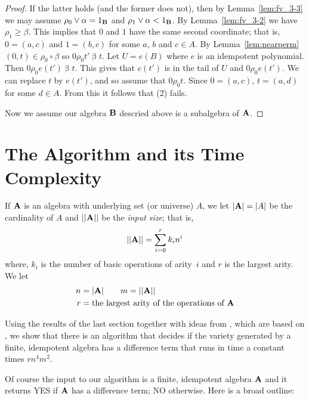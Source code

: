\begin{proof}
If the latter holds (and the former does not), then
by Lemma~\ref{lem:fv_3-3} we may 
assume $\rho_0 \join \alpha = 1_{\alg B}$ and
$\rho_1 \join \alpha < 1_{\alg B}$. By Lemma~\ref{lem:fv_3-2}
we have $\rho_1 \ge \beta$.
This implies that $0$ and $1$ have the same second coordinate; that is,
$0 = (a,c)$ and $1 = (b,c)$ for some $a$, $b$ and $c\in A$.
By Lemma~\ref{lem:nearperm} $(0,t) \in \rho_0 \circ \beta$
so $0 \mathrel {\rho_0} t' \mathrel{\beta} t$. Let $U = e(B)$
where $e$ is an idempotent polynomial. Then
$0 \mathrel {\rho_0} e(t') \mathrel{\beta} t$. This gives
that $e(t')$ is in the tail of $U$ and 
$0 \mathrel{\rho_0} e(t')$. We can
replace $t$ by $e(t')$, and so assume that 
$0 \mathrel{\rho_0} t$.
Since $0 = (a,c)$, $t = (a,d)$ for some $d\in A$. From this
it follows that (2) fails.

Now we assume our algebra $\mathbf{B}$ descried above is a subalgebra
of $\mathbf{A}$. 


\end{proof}









\section{The Algorithm and its Time Complexity}

If $\mathbf{A}$ is an algebra with underlying set (or universe) $A$,
we let $|\mathbf{A}| = |A|$ be the cardinality of
$A$ and $||\mathbf{A}||$ be the \emph{input size}; that is,
\[
||\mathbf{A}|| = \sum_{i=0}^r k_i n^i
\]
where, $k_i$ is the number of basic operations of arity~$i$ and $r$
is the largest arity. We let
\begin{align*}
n &= |\mathbf{A}|  \qquad m = ||\mathbf{A}|| \\
r &= \text{the largest arity of the operations of $\mathbf{A}$}
\end{align*}

Using the results of the last section together with ideas from
\cite{Freese:2009},
which are based on \cite{KearnesKiss1999},
we show that there is an algorithm that decides if the variety 
generated by a finite, idempotent
algebra has a difference term that
runs in time a constant times $rn^4m^2$.




Of course the input to our algorithm is a finite, idempotent algebra $\mathbf{A}$
and it returns YES if $\mathbf{A}$ has a difference term; NO otherwise. Here is a 
broad outline:

